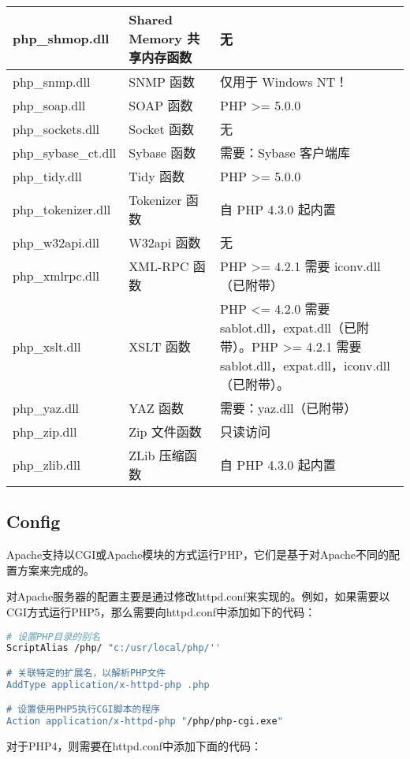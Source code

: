 \begin{longtable}{|m{60pt}|m{130pt}|m{200pt}|}
\hline
php\_shmop.dll			&Shared Memory 共享内存函数	&无\\
\hline
php\_snmp.dll			&SNMP 函数	&仅用于 Windows NT！\\
\hline
php\_soap.dll			&SOAP 函数	&PHP >= 5.0.0\\
\hline
php\_sockets.dll			&Socket 函数	&无\\
\hline
php\_sybase\_ct.dll		&Sybase 函数	&需要：Sybase 客户端库\\
\hline
php\_tidy.dll				&Tidy 函数	&PHP >= 5.0.0\\
\hline
php\_tokenizer.dll		&Tokenizer 函数	&自 PHP 4.3.0 起内置\\
\hline
php\_w32api.dll			&W32api 函数	&无\\
\hline
php\_xmlrpc.dll			&XML-RPC 函数	&PHP >= 4.2.1 需要 iconv.dll（已附带）\\
\hline
php\_xslt.dll				&XSLT 函数	&PHP <= 4.2.0 需要 sablot.dll，expat.dll（已附带）。PHP >= 4.2.1 需要 sablot.dll，expat.dll，iconv.dll（已附带）。\\
\hline
php\_yaz.dll				&YAZ 函数	&需要：yaz.dll（已附带）\\
\hline
php\_zip.dll				&Zip 文件函数	&只读访问\\
\hline
php\_zlib.dll				&ZLib 压缩函数	&自 PHP 4.3.0 起内置\\
\hline
\end{longtable}






\subsection{Config}

Apache支持以CGI或Apache模块的方式运行PHP，它们是基于对Apache不同的配置方案来完成的。

对Apache服务器的配置主要是通过修改httpd.conf来实现的。例如，如果需要以CGI方式运行PHP5，那么需要向httpd.conf中添加如下的代码：

\begin{lstlisting}[language=bash]
# 设置PHP目录的别名
ScriptAlias /php/ "c:/usr/local/php/''

# 关联特定的扩展名，以解析PHP文件
AddType application/x-httpd-php .php

# 设置使用PHP5执行CGI脚本的程序
Action application/x-httpd-php "/php/php-cgi.exe"
\end{lstlisting}

对于PHP4，则需要在httpd.conf中添加下面的代码：


